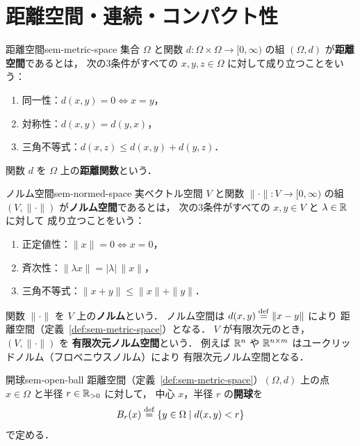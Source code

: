 \chapter{距離空間・連続・コンパクト性}
\label{ch:found-metric}

\begin{definition}{距離空間}{sem-metric-space}
  集合 $\Omega$ と関数 $d \colon \Omega \times \Omega \to [0, \infty)$ の組
  $(\Omega, d)$ が\textbf{距離空間}であるとは，
  次の3条件がすべての $x, y, z \in \Omega$ に対して成り立つことをいう：
  \begin{enumerate}
    \item[(i)] 同一性：$d(x, y) = 0 \iff x = y$，
    \item[(ii)] 対称性：$d(x, y) = d(y, x)$，
    \item[(iii)] 三角不等式：$d(x, z) \leq d(x, y) + d(y, z)$．
  \end{enumerate}
  関数 $d$ を $\Omega$ 上の\textbf{距離関数}という．
\end{definition}

\begin{definition}{ノルム空間}{sem-normed-space}
  実ベクトル空間 $V$ と関数 $\|\cdot\| \colon V \to [0, \infty)$ の組
  $(V, \|\cdot\|)$ が\textbf{ノルム空間}であるとは，
  次の3条件がすべての $x, y \in V$ と $\lambda \in \mathbb{R}$ に対して
  成り立つことをいう：
  \begin{enumerate}
    \item[(i)] 正定値性：$\|x\| = 0 \iff x = 0$，
    \item[(ii)] 斉次性：$\|\lambda x\| = |\lambda|\,\|x\|$，
    \item[(iii)] 三角不等式：$\|x + y\| \leq \|x\| + \|y\|$．
  \end{enumerate}
  関数 $\|\cdot\|$ を $V$ 上の\textbf{ノルム}という．
  ノルム空間は $d(x, y) \overset{\mathrm{def}}{=} \|x - y\|$ により
  距離空間（定義~\ref{def:sem-metric-space}）となる．
  $V$ が有限次元のとき，$(V, \|\cdot\|)$ を
  \textbf{有限次元ノルム空間}という．
  例えば $\mathbb{R}^n$ や $\mathbb{R}^{n \times m}$ はユークリッドノルム（フロベニウスノルム）により
  有限次元ノルム空間となる．
\end{definition}

\begin{definition}{開球}{sem-open-ball}
  距離空間（定義~\ref{def:sem-metric-space}）$(\Omega, d)$ 上の点 $x \in \Omega$ と半径 $r \in \mathbb{R}_{>0}$ に対して，
  中心 $x$，半径 $r$ の\textbf{開球}を
  \[
    B_r(x) \overset{\mathrm{def}}{=} \{y \in \Omega \mid d(x, y) < r\}
  \]
  で定める．
\end{definition}


